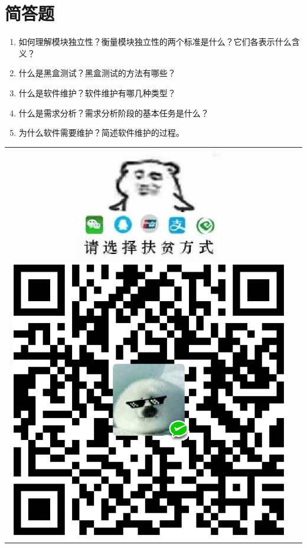 \documentclass{exam}
\begin{document}
\section{简答题}
\begin{enumerate}
	\item 如何理解模块独立性？衡量模块独立性的两个标准是什么？它们各表示什么含义？
	\item 什么是黑盒测试？黑盒测试的方法有哪些？
	\item 什么是软件维护？软件维护有哪几种类型？
	\item 什么是需求分析？需求分析阶段的基本任务是什么？
	\item 为什么软件需要维护？简述软件维护的过程。
\end{enumerate}
\clearpage
\centering
\begin{tabular}{cc}
	\includegraphics{help.png}
	\includegraphics[scale=0.5]{pay.jpeg}
\end{tabular}
\end{document}
